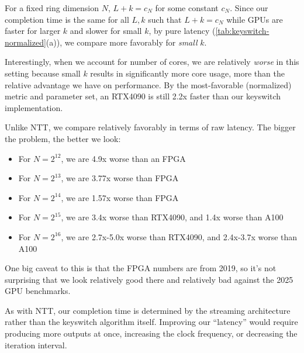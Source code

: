 \documentclass{article}
\begin{document}
	For a fixed ring dimension $N$, $L+k = c_N$ for some constant $c_N$. Since our completion time is the same for all $L,k$ such that $L+k=c_N$ while GPUs are faster for larger $k$ and slower for small $k$, by pure latency (\cref{tab:keyswitch-normalized}(a)), we compare more favorably for \emph{small} $k$.
	
	Interestingly, when we account for number of cores, we are relatively \emph{worse} in this setting because small $k$ results in significantly more core usage, more than the relative advantage we have on performance. By the most-favorable (normalized) metric and parameter set, an RTX4090 is still 2.2x faster than our keyswitch implementation. 
	
	Unlike NTT, we compare relatively favorably in terms of raw latency. The bigger the problem, the better we look:
	\begin{itemize}
			\item For $N=2^{12}$, we are 4.9x worse than an FPGA
			\item For $N=2^{13}$, we are 3.77x worse than FPGA
			\item For $N=2^{14}$, we are 1.57x worse than FPGA
			\item For $N=2^{15}$, we are 3.4x worse than RTX4090, and 1.4x worse than A100
			\item For $N=2^{16}$, we are 2.7x-5.0x worse than RTX4090, and 2.4x-3.7x worse than A100
		\end{itemize}
	One big caveat to this is that the FPGA numbers are from 2019, so it's not surprising that we look relatively good there and relatively bad against the 2025 GPU benchmarks.
	
	As with NTT, our completion time is determined by the streaming architecture rather than the keyswitch algorithm itself. Improving our ``latency'' would require producing more outputs at once, increasing the clock frequency, or decreasing the iteration interval.
\newpage
\printbibliography
\end{document}
